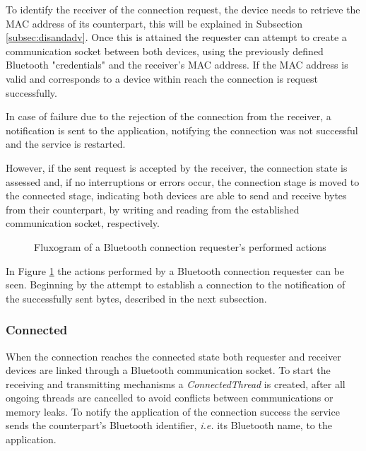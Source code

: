 To identify the receiver of the connection request, the device needs to retrieve the \gls{MAC} address of its counterpart, this will be explained in Subsection \ref{subsec:disandadv}. Once this is attained the requester can attempt to create a communication socket between both devices, using the previously defined Bluetooth "credentials" and the receiver's \gls{MAC} address. If the \gls{MAC} address is valid and corresponds to a device within reach the connection is request successfully.

In case of failure due to the rejection of the connection from the receiver, a notification is sent to the application, notifying the connection was not successful and the service is restarted.

However, if the sent request is accepted by the receiver, the connection state is assessed and, if no interruptions or errors occur, the connection stage is moved to the connected stage, indicating both devices are able to send and receive bytes from their counterpart, by writing and reading from the established communication socket, respectively.

\begin{figure}[ht]
	\noindent{}
	\caption{\label{fig:btrequester} Fluxogram of a Bluetooth connection requester's performed actions}
\end{figure}

In Figure \ref{fig:btrequester} the actions performed by a Bluetooth connection requester can be seen. Beginning by the attempt to establish a connection to the notification of the successfully sent bytes, described in the next subsection.

\subsubsection{Connected}
\label{subsubsec:connected}

When the connection reaches the connected state both requester and receiver devices are linked through a Bluetooth communication socket. To start the receiving and transmitting mechanisms a \textit{ConnectedThread} is created, after all ongoing threads are cancelled to avoid conflicts between communications or memory leaks. To notify the application of the connection success the service sends the counterpart's Bluetooth identifier, \textit{i.e.} its Bluetooth name, to the application.

